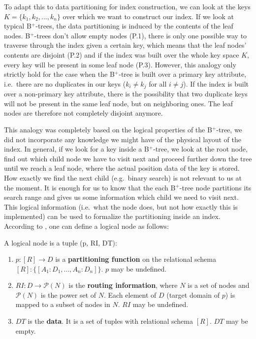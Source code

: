 \vspace{0.5cm}
To adapt this to data partitioning for index construction, we can look at the keys $K = \{k_1, k_2, ..., k_n\}$ over which we want to construct our index. If we look at typical B$^+$-trees, the data partitioning is induced by the contents of the leaf nodes. B$^+$-trees don't allow empty nodes (P.1), there is only one possible way to traverse through the index given a certain key, which means that the leaf nodes' contents are disjoint (P.2) and if the index was built over the whole key space $K$, every key will be present in some leaf node (P.3). However, this analogy only strictly hold for the case when the B$^+$-tree is built over a primary key attribute, i.e.~there are no duplicates in our keys ($k_i \neq k_j$ for all $i \neq j$). If the index is built over a non-primary key attribute, there is the possibility that two duplicate keys will not be present in the same leaf node, but on neighboring ones. The leaf nodes are therefore not completely disjoint anymore.  

This analogy was completely based on the logical properties of the B$^+$-tree, we did not incorporate any knowledge we might have of the physical layout of the index. In general, if we look for a key inside a B$^+$-tree, we look at the root node, find out which child node we have to visit next and proceed further down the tree until we reach a leaf node, where the actual position data of the key is stored. How exactly we find the next child (e.g.~binary search) is not relevant to us at the moment. It is enough for us to know that the each B$^+$-tree node partitions its search range and gives us some information which child we need to visit next. This logical information (i.e.~what the node does, but not how exactly this is implemented) can be used to formalize the partitioning inside an index. According to \citeauthor{Dittrich2021} \cite{Dittrich2021}, one can define a logical node as follows:

\vspace{0.5cm}
\begin{definition}\label{def:logicalnode}
A logical node is a tuple (p, RI, DT):
\begin{enumerate}
    \item $p: [R] \rightarrow D$ is a \textbf{partitioning function} on the relational schema $[R] : \{ [A_1 : D_1, ..., A_n : D_n] \}$. $p$ may be undefined.
    \item $RI : D \rightarrow \mathcal{P}(N)$ is the \textbf{routing information}, where $N$ is a set of nodes and $\mathcal{P}(N)$ is the power set of $N$. Each element of $D$ (target domain of $p$) is mapped to a subset of nodes in $N$. $RI$ may be undefined.
    \item $DT$ is the \textbf{data}. It is a set of tuples with relational schema $[R]$. $DT$ may be empty.
\end{enumerate}
\end{definition}

